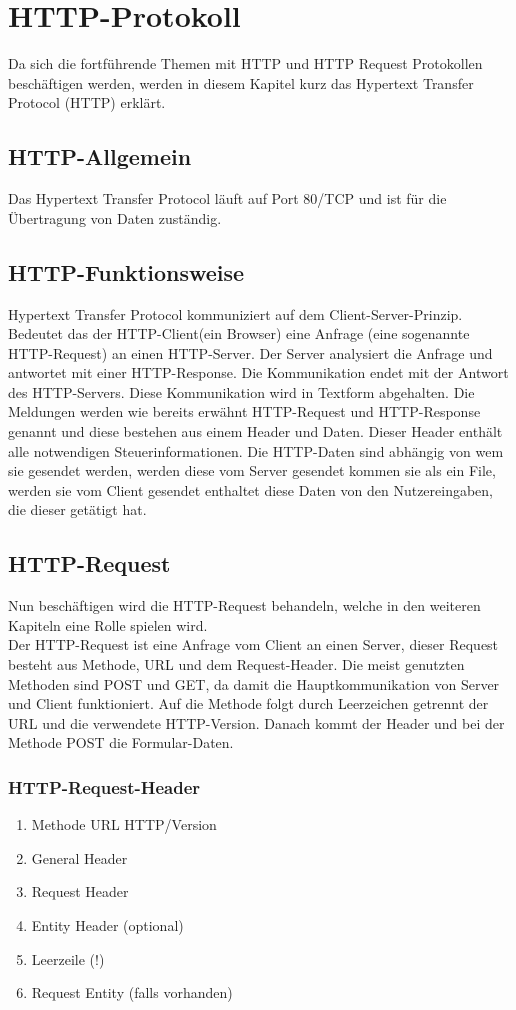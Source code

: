 \section{HTTP-Protokoll}
Da sich die fortführende Themen mit HTTP und HTTP Request Protokollen beschäftigen werden, werden in diesem Kapitel kurz das Hypertext Transfer Protocol (HTTP) erklärt. 
\subsection{HTTP-Allgemein}
Das Hypertext Transfer Protocol läuft auf Port 80/TCP und ist für die Übertragung von Daten zuständig.
\subsection{HTTP-Funktionsweise}
Hypertext Transfer Protocol kommuniziert auf dem Client-Server-Prinzip. Bedeutet das der HTTP-Client(ein Browser) eine Anfrage (eine sogenannte HTTP-Request) an einen HTTP-Server. Der Server analysiert die Anfrage und antwortet mit einer HTTP-Response. Die Kommunikation endet mit der Antwort des HTTP-Servers. Diese Kommunikation wird in Textform abgehalten. Die Meldungen werden wie bereits erwähnt HTTP-Request und HTTP-Response genannt und diese bestehen aus einem Header und Daten. Dieser Header enthält alle notwendigen Steuerinformationen. Die HTTP-Daten sind abhängig von wem sie gesendet werden, werden diese vom Server gesendet kommen sie als ein File, werden sie vom Client gesendet enthaltet diese Daten von den Nutzereingaben, die dieser getätigt hat.
\subsection{HTTP-Request}
Nun beschäftigen wird die HTTP-Request behandeln, welche in den weiteren Kapiteln eine Rolle spielen wird.\\Der HTTP-Request ist eine Anfrage vom Client an einen Server, dieser Request besteht aus Methode, URL und dem Request-Header. Die meist genutzten Methoden sind POST und GET, da damit die Hauptkommunikation von Server und Client funktioniert. Auf die Methode folgt durch Leerzeichen getrennt der URL und die verwendete HTTP-Version. Danach kommt der Header und bei der Methode POST die Formular-Daten.
\subsubsection{HTTP-Request-Header}
\begin{enumerate}
\item Methode URL HTTP/Version
\item General Header
\item Request Header
\item Entity Header (optional)
\item Leerzeile (!)
\item Request Entity (falls vorhanden)
\end{enumerate}
